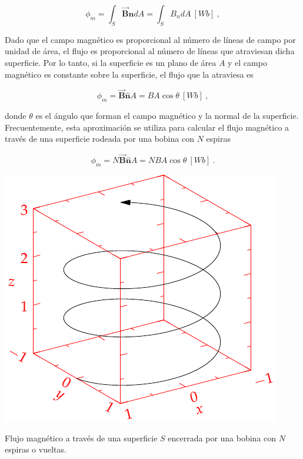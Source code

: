 \documentclass{tufte-handout}
\begin{document}
\begin{equation}
\phi_m = \int_{S} \mathbf{\vec{B}}\mathbf{\hat{n}}dA = \int_{S}B_ndA ~ [Wb]~, 
\end{equation}

Dado que el campo magnético es proporcional al número de líneas de campo por unidad de área, el flujo es proporcional al número de líneas que atraviesan dicha superficie. Por lo tanto, si la superficie es un plano de área $A$ y el campo magnético es constante sobre la superficie, el flujo que la atraviesa es

\begin{equation}
\phi_m = \mathbf{\vec{B}}\mathbf{\hat{n}}A = BA\cos{\theta} ~ [Wb]~,
\end{equation}

donde $\theta$ es el ángulo que forman el campo magnético y la normal de la superficie. Frecuentemente, esta aproximación se utiliza para calcular el flujo magnético a través de una superficie rodeada por una bobina con $N$ espiras

\begin{equation}
\phi_m = N\mathbf{\vec{B}}\mathbf{\hat{n}}A = NBA\cos{\theta} ~ [Wb]~.
\end{equation}

\begin{marginfigure}%
    \includegraphics[width=\linewidth]{helix}
    \caption{Flujo magnético a través de una superficie $S$ encerrada por una bobina con $N$ espiras o vueltas.}
    \label{fig:flujomagneticoespira}
\end{marginfigure}
\end{document}
